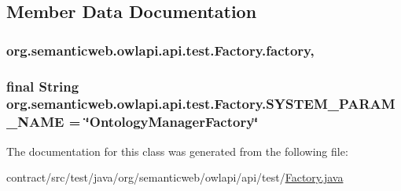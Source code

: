 \subsection{Member Data Documentation}
\hypertarget{classorg_1_1semanticweb_1_1owlapi_1_1api_1_1test_1_1_factory_aedb63f4866764127ff8fa465ef1f2477}{
\subsubsection[{factory}]{ org.\-semanticweb.\-owlapi.\-api.\-test.\-Factory.\-factory\hspace{0.3cm}{\ttfamily [static]}, {\ttfamily [private]}}}\label{classorg_1_1semanticweb_1_1owlapi_1_1api_1_1test_1_1_factory_aedb63f4866764127ff8fa465ef1f2477}
\hypertarget{classorg_1_1semanticweb_1_1owlapi_1_1api_1_1test_1_1_factory_a3f01c4d3b122453cd64dcde9e18c79ec}{
\subsubsection[{S\-Y\-S\-T\-E\-M\-\_\-\-P\-A\-R\-A\-M\-\_\-\-N\-A\-M\-E}]{\setlength{\rightskip}{0pt plus 5cm}final String org.\-semanticweb.\-owlapi.\-api.\-test.\-Factory.\-S\-Y\-S\-T\-E\-M\-\_\-\-P\-A\-R\-A\-M\-\_\-\-N\-A\-M\-E = \char`\"{}Ontology\-Manager\-Factory\char`\"{}\hspace{0.3cm}{\ttfamily [static]}}}\label{classorg_1_1semanticweb_1_1owlapi_1_1api_1_1test_1_1_factory_a3f01c4d3b122453cd64dcde9e18c79ec}


The documentation for this class was generated from the following file\-:\begin{DoxyCompactItemize}
\item 
contract/src/test/java/org/semanticweb/owlapi/api/test/\hyperlink{_factory_8java}{Factory.\-java}\end{DoxyCompactItemize}
